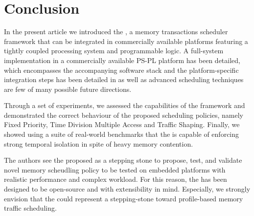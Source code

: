 \section{Conclusion}
    

In the present article we introduced the \schim, a memory transactions
scheduler framework that can be integrated in commercially available
platforms featuring a tightly coupled processing system and
programmable logic. A full-system implementation in a commercially
available PS-PL platform has been detailed, which encompasses the
accompanying software stack and the platform-specific integration
steps has been detailed in as well as advanced scheduling techniques
are few of many possible future directions.

Through a set of experiments, we assessed the capabilities of the
framework and demonstrated the correct behaviour of the proposed
scheduling policies, namely Fixed Priority, Time Division Multiple
Access and Traffic Shaping. Finally, we showed using a suite of
real-world benchmarks that the \schim is capable of enforcing strong
temporal isolation in spite of heavy memory contention.

The authors see the proposed \schim as a stepping stone to propose,
test, and validate novel memory scheudling policy to be tested on
embedded platforms with realistic performance and complex
workload. For this reason, the \schim has been designed to be
open-source and with extensibility in mind.  Especially, we strongly
envision that the \schim could represent a stepping-stone toward
profile-based memory traffic scheduling.
